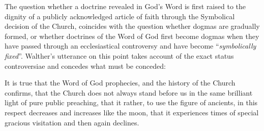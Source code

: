 {\color{Black} \par  The question whether a doctrine revealed in God’s Word is first raised to the dignity of a publicly acknowledged article of faith through the Symbolical decision of the Church, coincides with the question whether dogmas are gradually formed, or whether doctrines of the Word of God first become dogmas when they have passed through an ecclesiastical controversy and have become “\textit{symbolically fixed}”.  Walther’s utterance on this point takes account of the exact status controversiae and concedes what must be conceded:}
\begin{fancyquotes}It is true that the Word of God prophecies, and the history of the Church confirms, that the Church does not always stand before us in the same brilliant light of pure public preaching, that it rather, to use the figure of ancients, in this respect decreases and increases like the moon, that it experiences times of special gracious visitation and then again declines.


\end{fancyquotes}
